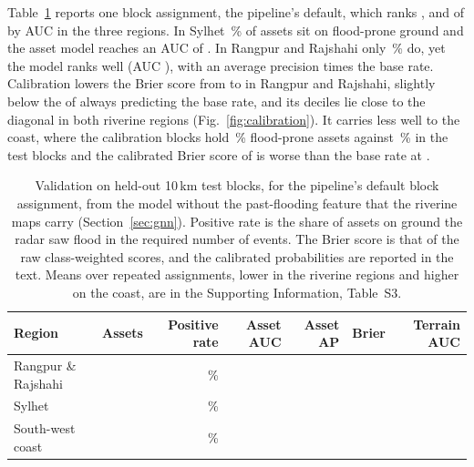 \documentclass[10pt,a4paper,twocolumn]{article}
\begin{document}
Table~\ref{tab:validation} reports one block assignment, the pipeline's default, which ranks \RRDefaultSeedRank{}, \SylhetDefaultSeedRank{} and \CoastalDefaultSeedRank{} of \RRBenchSeeds{} by AUC in the three regions. In Sylhet \SylhetLabelRate{}\,\% of assets sit on flood-prone ground and the asset model reaches an AUC of \SylhetValAUC{}. In Rangpur and Rajshahi only \RRLabelRate{}\,\% do, yet the model ranks well (AUC \RRValAUC{}), with an average precision \RRValAPLift{} times the base rate. Calibration lowers the Brier score from \RRValBrier{} to \RRValBrierCalibrated{} in Rangpur and Rajshahi, slightly below the \RRValBrierBaseRate{} of always predicting the base rate, and its deciles lie close to the diagonal in both riverine regions (Fig.~\ref{fig:calibration}). It carries less well to the coast, where the calibration blocks hold \CoastalCalibBlockRate{}\,\% flood-prone assets against \CoastalTestBlockRate{}\,\% in the test blocks and the calibrated Brier score of \CoastalValBrierCalibrated{} is worse than the base rate at \CoastalValBrierBaseRate{}.

\begin{table}[tp]
\centering
\small
\begin{tabular}{lrrrrrr}
\toprule
Region & Assets & Positive rate & Asset AUC & Asset AP & Brier & Terrain AUC \\
\midrule
Rangpur \& Rajshahi & \RRAssets{} & \RRLabelRate{}\,\% & \RRValAUC{} & \RRValAP{} & \RRValBrier{} & \RRHazardAUC{} \\
Sylhet & \SylhetAssets{} & \SylhetLabelRate{}\,\% & \SylhetValAUC{} & \SylhetValAP{} & \SylhetValBrier{} & \SylhetHazardAUC{} \\
South-west coast & \CoastalAssets{} & \CoastalLabelRate{}\,\% & \CoastalValAUC{} & \CoastalValAP{} & \CoastalValBrier{} & \CoastalHazardAUC{} \\
\bottomrule
\end{tabular}
\caption{Validation on held-out 10\,km test blocks, for the pipeline's default block assignment, from the model without the past-flooding feature that the riverine maps carry (Section~\ref{sec:gnn}). Positive rate is the share of assets on ground the radar saw flood in the required number of events. The Brier score is that of the raw class-weighted scores, and the calibrated probabilities are reported in the text. Means over repeated assignments, lower in the riverine regions and higher on the coast, are in the Supporting Information, Table~S3.}
\label{tab:validation}
\end{table}
\end{document}
